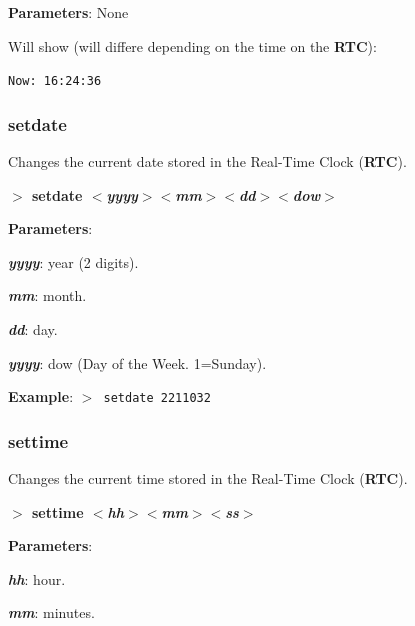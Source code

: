 \documentclass[a4paper,11pt]{article}
\begin{document}
        \textbf{Parameters}: None

        Will show (will differe depending on the time on the \textbf{RTC}):

        \hspace{1cm}\texttt{Now:\ 16:24:36}

        \subsubsection{{\color{blue}setdate}}
        Changes the current date stored in the Real-Time Clock (\textbf{RTC}).

        \hspace{1.9cm}\textbf{$>$ setdate \textit{$<$yyyy$>$$<$mm$>$$<$dd$>$$<$dow$>$}}

        \textbf{Parameters}:

        \hspace{1cm}\textbf{\textit{yyyy}}: year (2 digits).

        \hspace{1cm}\textbf{\textit{mm}}: month.

        \hspace{1cm}\textbf{\textit{dd}}: day.

        \hspace{1cm}\textbf{\textit{yyyy}}: dow (Day of the Week. 1=Sunday).

        \textbf{Example}: \texttt{$>$ setdate 2211032}

        \subsubsection{{\color{blue}settime}}
        Changes the current time stored in the Real-Time Clock (\textbf{RTC}).

        \hspace{1.9cm}\textbf{$>$ settime \textit{$<$hh$>$$<$mm$>$$<$ss$>$}}

        \textbf{Parameters}:

        \hspace{1cm}\textbf{\textit{hh}}: hour.

        \hspace{1cm}\textbf{\textit{mm}}: minutes.
\end{document}
